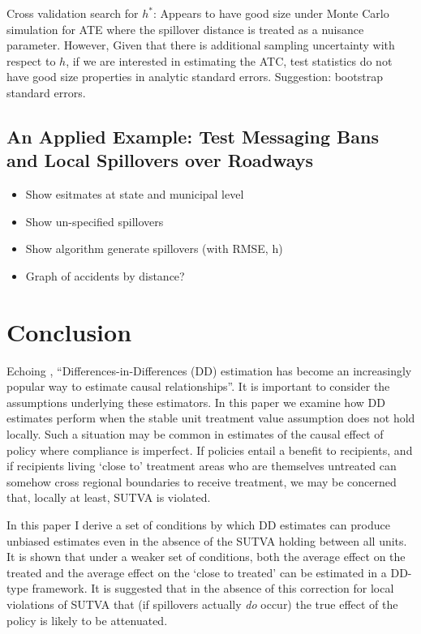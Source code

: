 \documentclass[12pt]{article}
\begin{document}
\begin{spacing}{1.3}
Cross validation search for $h^{*}$: Appears to have good size under Monte
Carlo simulation for ATE where the spillover distance is treated as a nuisance
parameter.  However, Given that there is additional sampling uncertainty
with respect to $h$, if we are interested in estimating the ATC, test statistics
do not have good size properties in analytic standard errors.  Suggestion:
bootstrap standard errors.


\subsection{An Applied Example: Test Messaging Bans and Local Spillovers over
  Roadways}
\label{sscn:roadsTexting}
\citet{AboukAdams2013}

\begin{itemize}
\item Show esitmates at state and municipal level
\item Show un-specified spillovers
\item Show algorithm generate spillovers (with RMSE, h)
\item Graph of accidents by distance?
\end{itemize}

\section{Conclusion}
Echoing \citet{Bertrandetal2004}, ``Differences-in-Differences (DD) estimation 
has become an increasingly popular way to estimate causal relationships''.  
It is important to consider the assumptions underlying these estimators.  
In this paper we examine how DD estimates perform when the stable unit treatment 
value assumption does not hold locally.  Such a situation may be common in 
estimates of the causal effect of policy where compliance is imperfect. If 
policies entail a benefit to recipients, and if recipients living `close to' 
treatment areas who are themselves untreated can somehow cross regional 
boundaries to receive treatment, we may be concerned that, locally at least, 
SUTVA is violated.

In this paper I derive a set of conditions by which DD estimates can produce 
unbiased estimates even in the absence of the SUTVA holding between all units.  
It is shown that under a weaker set of conditions, both the average effect on the 
treated and the average effect on the `close to treated' can be estimated in a 
DD-type framework.  It is suggested that in the absence of this correction for 
local violations of SUTVA that (if spillovers actually \emph{do} occur) the true 
effect of the policy is likely to be attenuated.  


\end{spacing}
\end{document}

